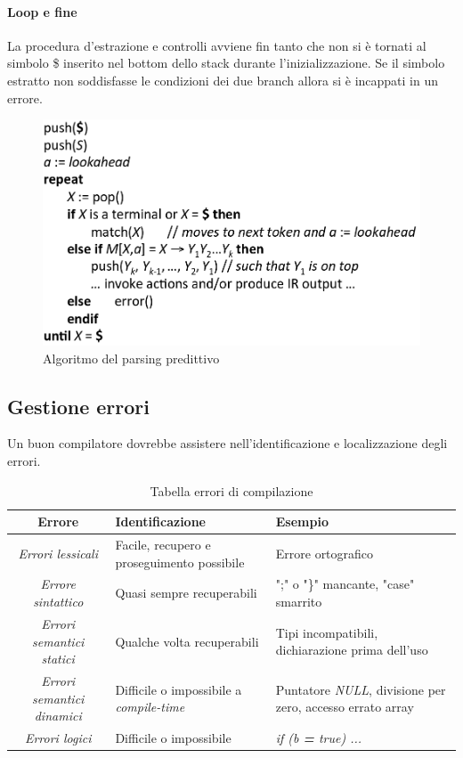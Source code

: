 \paragraph{Loop e fine}
La procedura d'estrazione e controlli avviene fin tanto che non si \`e tornati
al simbolo \$ inserito nel bottom dello stack durante l'inizializzazione. Se
il simbolo estratto non soddisfasse le condizioni dei due branch allora si \`e
incappati in un errore.

\begin{figure}[H]
\begin{center}
\includegraphics[scale=0.45]{res/image/PPP}
\end{center}
\caption{Algoritmo del parsing predittivo}
\label{img:PPP}
\end{figure}

\subsection{Gestione errori}
Un buon compilatore dovrebbe assistere nell'identificazione e localizzazione
degli errori.

\begin{table}[H]
\begin{center}
\begin{tabular}{|c|p{6cm}|p{4cm}|}
\hline
\textbf{Errore} & \textbf{Identificazione} & \textbf{Esempio} \\ \hline
\textit{Errori lessicali} &
Facile, recupero e proseguimento possibile &
Errore ortografico \\ \hline
\textit{Errore sintattico} &
Quasi sempre recuperabili &
";" o "\}" mancante, "case" smarrito \\ \hline
\textit{Errori semantici statici} &
Qualche volta recuperabili &
Tipi incompatibili, dichiarazione prima dell'uso \\ \hline
\textit{Errori semantici dinamici} &
Difficile o impossibile a \textit{compile-time} &
Puntatore \textit{NULL}, divisione per zero, accesso errato array \\ \hline
\textit{Errori logici} &
Difficile o impossibile &
\textit{if (b \textbf{=} true) ...} \\ \hline
\end{tabular}
\end{center}
\caption{Tabella errori di compilazione}
\label{tab:compiler_error}
\end{table}

